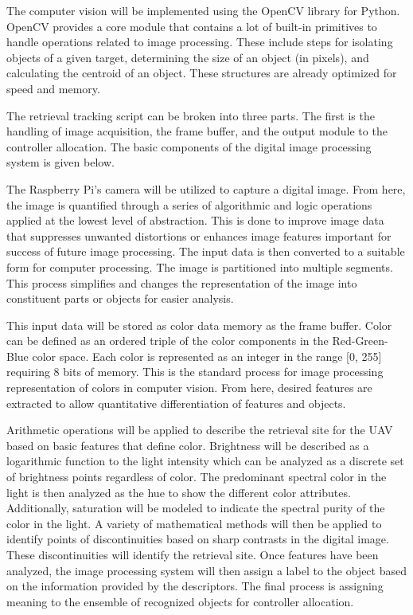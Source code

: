         The computer vision will be implemented using the OpenCV library for Python. OpenCV provides a core module that contains a lot of built-in primitives to handle operations related to image processing. These include steps for isolating objects of a given target, determining the size of an object (in pixels), and calculating the centroid of an object. These structures are already optimized for speed and memory. 
        
        The retrieval tracking script can be broken into three parts. The first is the handling of image acquisition, the frame buffer, and the output module to the controller allocation. The basic components of the digital image processing system is given below. 

        The Raspberry Pi’s camera will be utilized to capture a digital image. From here, the image is quantified through a series of algorithmic and logic operations applied at the lowest level of abstraction. This is done to improve image data that suppresses unwanted distortions or enhances image features important for success of future image processing. The input data is then converted to a suitable form for computer processing. The image is partitioned into multiple segments. This process simplifies and changes the representation of the image into constituent parts or objects for easier analysis.

        This input data will be stored as color data memory as the frame buffer. Color can be defined as an ordered triple of the color components in the Red-Green-Blue color space. Each color is represented as an integer in the range [0, 255] requiring 8 bits of memory. This is the standard process for image processing representation of colors in computer vision. From here, desired features are extracted to allow quantitative differentiation of features and objects.

        Arithmetic operations will be applied to describe the retrieval site for the UAV based on basic features that define color. Brightness will be described as a logarithmic function to the light intensity which can be analyzed as a discrete set of brightness points regardless of color. The predominant spectral color in the light is then analyzed as the hue to show the different color attributes. Additionally, saturation will be modeled to indicate the spectral purity of the color in the light. A variety of mathematical methods will then be applied to identify points of discontinuities based on sharp contrasts in the digital image. These discontinuities will identify the retrieval site. Once features have been analyzed, the image processing system will then assign a label to the object based on the information provided by the descriptors. The final process is assigning meaning to the ensemble of recognized objects for controller allocation. 


